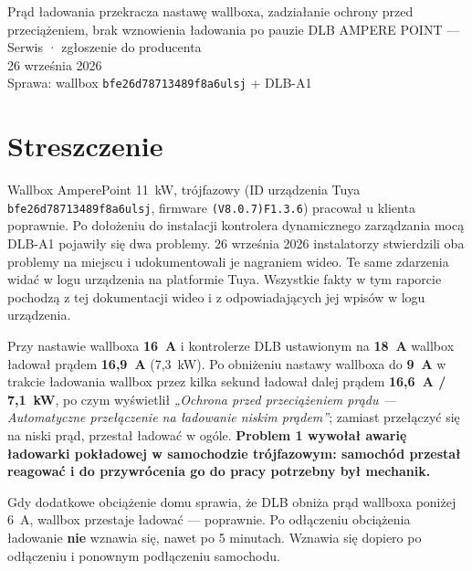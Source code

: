\documentclass[11pt,a4paper]{article}
\begin{document}
%
{Prąd ładowania przekracza nastawę wallboxa, zadziałanie ochrony przed przeciążeniem, brak wznowienia ładowania po pauzie DLB}%
{AMPERE POINT — Serwis · zgłoszenie do producenta\\26 września 2026\\Sprawa: wallbox \texttt{bfe26d78713489f8a6ulsj} + DLB-A1}

\section{Streszczenie}

{\sloppy Wallbox AmperePoint 11~kW, trójfazowy (ID urządzenia Tuya \texttt{bfe26d78713489f8a6ulsj}, firmware \texttt{(V8.0.7)F1.3.6}) pracował u klienta poprawnie. Po dołożeniu do instalacji kontrolera dynamicznego zarządzania mocą DLB-A1 pojawiły się dwa problemy. 26 września 2026 instalatorzy stwierdzili oba problemy na miejscu i udokumentowali je nagraniem wideo. Te same zdarzenia widać w logu urządzenia na platformie Tuya. Wszystkie fakty w tym raporcie pochodzą z tej dokumentacji wideo i z odpowiadających jej wpisów w logu urządzenia.\par}

\begin{apredb}
Przy nastawie wallboxa \textbf{16~A} i kontrolerze DLB ustawionym na \textbf{18~A} wallbox ładował prądem \textbf{16,9~A} (7,3~kW). Po obniżeniu nastawy wallboxa do \textbf{9~A} w trakcie ładowania wallbox przez kilka sekund ładował dalej prądem \textbf{16,6~A / 7,1~kW}, po czym wyświetlił \emph{„Ochrona przed przeciążeniem prądu — Automatyczne przełączenie na ładowanie niskim prądem”}; zamiast przełączyć się na niski prąd, przestał ładować w ogóle. \textbf{Problem 1 wywołał awarię ładowarki pokładowej w samochodzie trójfazowym: samochód przestał reagować i do przywrócenia go do pracy potrzebny był mechanik.}
\end{apredb}

\begin{apwarnb}
Gdy dodatkowe obciążenie domu sprawia, że DLB obniża prąd wallboxa poniżej 6~A, wallbox przestaje ładować — poprawnie. Po odłączeniu obciążenia ładowanie \textbf{nie} wznawia się, nawet po 5 minutach. Wznawia się dopiero po odłączeniu i ponownym podłączeniu samochodu.
\end{apwarnb}
\end{document}
